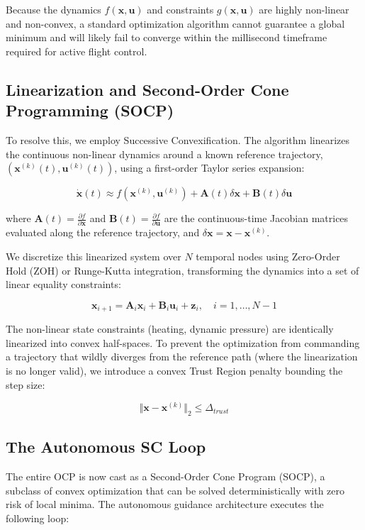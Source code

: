 \documentclass[11pt,a4paper]{article}
\theoremstyle{definition}
\numberwithin{equation}{section}
\begin{document}
Because the dynamics $f(\mathbf{x}, \mathbf{u})$ and constraints $g(\mathbf{x}, \mathbf{u})$ are highly non-linear and non-convex, a standard optimization algorithm cannot guarantee a global minimum and will likely fail to converge within the millisecond timeframe required for active flight control.

\subsection{Linearization and Second-Order Cone Programming (SOCP)}
To resolve this, we employ Successive Convexification. The algorithm linearizes the continuous non-linear dynamics around a known reference trajectory, $(\mathbf{x}^{(k)}(t), \mathbf{u}^{(k)}(t))$, using a first-order Taylor series expansion:

$$\dot{\mathbf{x}}(t) \approx f(\mathbf{x}^{(k)}, \mathbf{u}^{(k)}) + \mathbf{A}(t) \delta\mathbf{x} + \mathbf{B}(t) \delta\mathbf{u}$$

where $\mathbf{A}(t) = \frac{\partial f}{\partial \mathbf{x}}$ and $\mathbf{B}(t) = \frac{\partial f}{\partial \mathbf{u}}$ are the continuous-time Jacobian matrices evaluated along the reference trajectory, and $\delta\mathbf{x} = \mathbf{x} - \mathbf{x}^{(k)}$.

We discretize this linearized system over $N$ temporal nodes using Zero-Order Hold (ZOH) or Runge-Kutta integration, transforming the dynamics into a set of linear equality constraints:

$$\mathbf{x}_{i+1} = \mathbf{A}_i \mathbf{x}_i + \mathbf{B}_i \mathbf{u}_i + \mathbf{z}_i, \quad i = 1, \dots, N-1$$

The non-linear state constraints (heating, dynamic pressure) are identically linearized into convex half-spaces. To prevent the optimization from commanding a trajectory that wildly diverges from the reference path (where the linearization is no longer valid), we introduce a convex Trust Region penalty bounding the step size:

$$\Vert \mathbf{x} - \mathbf{x}^{(k)} \Vert_2 \le \Delta_{trust}$$

\subsection{The Autonomous SC Loop}
The entire OCP is now cast as a Second-Order Cone Program (SOCP), a subclass of convex optimization that can be solved deterministically with zero risk of local minima. The autonomous guidance architecture executes the following loop:
\end{document}
